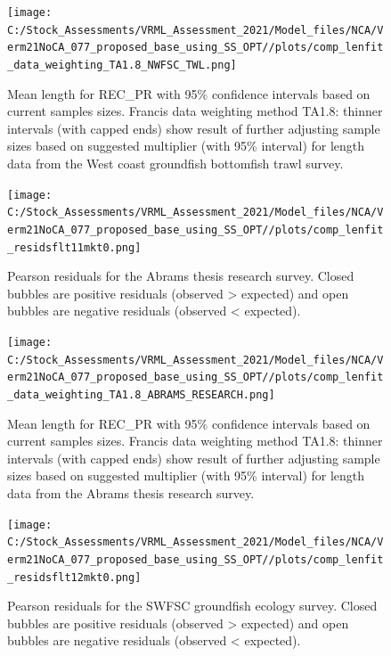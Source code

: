 \documentclass[
  english,
  a4paper,
]{article}
\begin{document}
\begin{figure}
\centering
\texttt{[image: C:/Stock\_Assessments/VRML\_Assessment\_2021/Model\_files/NCA/Verm21NoCA\_077\_proposed\_base\_using\_SS\_OPT//plots/comp\_lenfit\_data\_weighting\_TA1.8\_NWFSC\_TWL.png]}
\caption{Mean length for REC\_PR with 95\% confidence intervals based on current samples sizes. Francis data weighting method TA1.8: thinner intervals (with capped ends) show result of further adjusting sample sizes based on suggested multiplier (with 95\% interval) for length data from the West coast groundfish bottomfish trawl survey.\label{fig:mean-len-fit-NWFSC-TWL}}
\end{figure}

\begin{figure}
\centering
\texttt{[image: C:/Stock\_Assessments/VRML\_Assessment\_2021/Model\_files/NCA/Verm21NoCA\_077\_proposed\_base\_using\_SS\_OPT//plots/comp\_lenfit\_residsflt11mkt0.png]}
\caption{Pearson residuals for the Abrams thesis research survey. Closed bubbles are positive residuals (observed \textgreater{} expected) and open bubbles are negative residuals (observed \textless{} expected).\label{fig:len-pearson-ABRAMS-RESEARCH}}
\end{figure}

\begin{figure}
\centering
\texttt{[image: C:/Stock\_Assessments/VRML\_Assessment\_2021/Model\_files/NCA/Verm21NoCA\_077\_proposed\_base\_using\_SS\_OPT//plots/comp\_lenfit\_data\_weighting\_TA1.8\_ABRAMS\_RESEARCH.png]}
\caption{Mean length for REC\_PR with 95\% confidence intervals based on current samples sizes. Francis data weighting method TA1.8: thinner intervals (with capped ends) show result of further adjusting sample sizes based on suggested multiplier (with 95\% interval) for length data from the Abrams thesis research survey.\label{fig:mean-len-fit-ABRAMS-RESEARCH}}
\end{figure}

\begin{figure}
\centering
\texttt{[image: C:/Stock\_Assessments/VRML\_Assessment\_2021/Model\_files/NCA/Verm21NoCA\_077\_proposed\_base\_using\_SS\_OPT//plots/comp\_lenfit\_residsflt12mkt0.png]}
\caption{Pearson residuals for the SWFSC groundfish ecology survey. Closed bubbles are positive residuals (observed \textgreater{} expected) and open bubbles are negative residuals (observed \textless{} expected).\label{fig:len-pearson-SWFSC-GF-ECOL}}
\end{figure}
\end{document}
